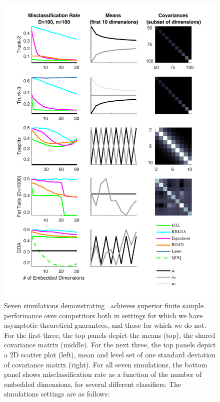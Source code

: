\documentclass[10pt]{article}
\begin{document}
%





\begin{figure}[h!]
\centering
\includegraphics[width=0.8\linewidth]{../Figs/plot_all}
\caption{
Seven simulations demonstrating \Lol~achieves superior finite sample performance over competitors both in settings for which we have asymptotic theoretical guarantees, and those for which we do not.
For the first three, the top panels depict the means (top), the shared covariance matrix (middle).  For the next three, the top panels depict a 2D scatter plot (left), mean and level set of one standard deviation of covariance matrix (right).  For all seven simulations, the bottom panel shows misclassification rate as a function of the number of embedded dimensions, for several different classifiers.  The simulations settings are as follows:
}
\end{figure}
\end{document}
